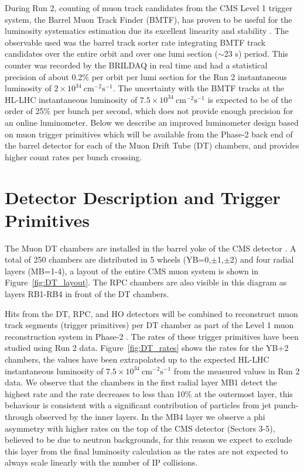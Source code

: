 During Run 2, counting of muon track candidates from the CMS Level 1 trigger system, the Barrel Muon Track Finder (BMTF),
has proven to be useful for the luminosity systematics estimation due its excellent linearity and stability \cite{LUM-17-001}.
The observable used was the barrel track sorter rate integrating BMTF track candidates over the entire orbit and over one lumi section ($\sim$23 s) period.
This counter was recorded by the BRILDAQ in real time and had a statistical precision of about 0.2\% per orbit per lumi section for the Run 2 instantaneous luminosity of  $2\times10^{34}\ \text{cm}^{-2}\text{s}^{-1}$.
The  uncertainty with the BMTF tracks at the HL-LHC instantaneous luminosity of $7.5\times10^{34}\ \text{cm}^{-2}\text{s}^{-1}$
is expected to be of the order of 25\% per bunch per second, which does not provide enough precision for an online luminometer.
Below we describe an improved luminometer design based on muon trigger primitives which will be available 
from the Phase-2 back end of the barrel detector for each of the Muon Drift Tube (DT) chambers, and provides higher count rates per bunch crossing.


\section{Detector Description and Trigger Primitives}

The Muon DT chambers are installed in the barrel yoke of the CMS detector \cite{DT-2009}.
A total of 250 chambers are distributed in 5 wheels (YB=0,$\pm$1,$\pm$2) and four radial layers (MB=1-4),
a layout of the entire  CMS muon system is shown in Figure~\ref{fig:DT_layout}.
The RPC chambers are also visible in this diagram as layers RB1-RB4 in front of the DT chambers.

Hits from the DT, RPC, and HO detectors will be combined to reconstruct muon track segments (trigger primitives)
per DT chamber as part of the  Level 1 muon reconstruction system in Phase-2 \cite{CERN-LHCC-2017-012}.
The rates of these trigger primitives have been studied using Run 2 data.
Figure~\ref{fig:DT_rates} shows the rates for the YB+2  chambers,
the values have been extrapolated up to the expected HL-LHC instantaneous luminosity
of  $7.5\times10^{34}\ \text{cm}^{-2}\text{s}^{-1}$ from the measured values in Run 2 data.
We observe that the chambers in the first radial layer MB1 detect the highest rate
and the rate decreases to less than 10\% at the outermost layer,
this behaviour is consistent with a significant contribution of particles from jet punch-through observed by the inner layers.
In the MB4 layer we observe a phi asymmetry with higher rates on the top of the CMS detector (Sectors 3-5), believed to be due to neutron backgrounds,
for this reason we expect to exclude this layer from the final luminosity calculation as the rates are not expected to always scale linearly with the number of IP collisions. 




